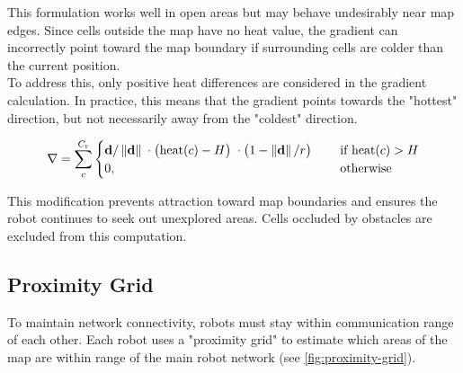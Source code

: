 This formulation works well in open areas but may behave undesirably near map edges. Since cells outside the map have no heat value, the gradient can incorrectly point toward the map boundary if surrounding cells are colder than the current position.  \\

To address this, only positive heat differences are considered in the gradient calculation. In practice, this means that the gradient points towards the "hottest" direction, but not necessarily away from the "coldest" direction.

\begin{equation}
\label{eq:robot-gradient}
    \nabla = \sum_c^{C_\mathrm{r}}
    \begin{cases}
        \mathbf{d}/\left\lVert\mathbf{d}\right\rVert      \; \cdot
        \big(\mathrm{heat}(c) - H\big)    \; \cdot
        \big(1 - \left\lVert\mathbf{d}\right\rVert/r\big) \; \quad &\text{if } \mathrm{heat}(c) > H
        \\
        0, \quad &\text{otherwise}
    \end{cases}
\end{equation}

This modification prevents attraction toward map boundaries and ensures the robot continues to seek out unexplored areas. Cells occluded by obstacles are excluded from this computation.


\subsection{Proximity Grid}
To maintain network connectivity, robots must stay within communication range of each other. Each robot uses a "proximity grid" to estimate which areas of the map are within range of the main robot network (see \cref{fig:proximity-grid}).

